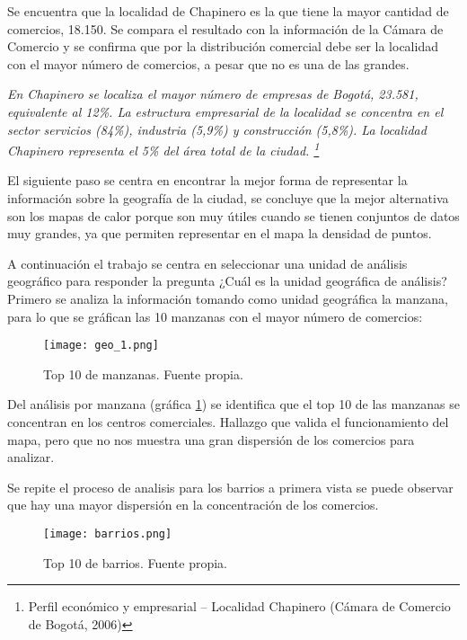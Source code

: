 \documentclass[a4paper]{article}
\begin{document}
Se encuentra que la localidad de Chapinero es la que tiene la mayor cantidad de comercios, 18.150. Se compara el resultado con la información de la Cámara de Comercio y se confirma que por la distribución comercial debe ser la localidad con el mayor número de comercios, a pesar que no es una de las grandes.

\begin{center}
	\textit{En Chapinero se localiza el mayor número de empresas de Bogotá, 23.581, equivalente al 12\%. La estructura empresarial de la localidad se concentra en el sector servicios (84\%), industria (5,9\%) y construcción (5,8\%). La localidad Chapinero representa el 5\% del área total de la ciudad. \footnote{Perfil económico y empresarial – Localidad Chapinero (Cámara de Comercio de Bogotá, 2006)}}
\end{center}

El siguiente paso se centra en encontrar la mejor forma de representar la información sobre la geografía de la ciudad, se concluye que la mejor alternativa son los mapas de calor porque son muy útiles cuando se tienen conjuntos de datos muy grandes, ya que permiten representar en el mapa la densidad de puntos. 

A continuación el trabajo se centra en seleccionar una unidad de análisis geográfico para responder la pregunta ¿Cuál es la unidad geográfica de análisis? Primero se analiza la información tomando como unidad geográfica la manzana, para lo que se gráfican las 10 manzanas con el mayor número de comercios:

\begin{figure}[h]
    \centering
	\texttt{[image: geo\_1.png]}
    \caption{Top 10 de manzanas. Fuente propia.}
    \label{fig:manzanas}
\end{figure}

Del análisis por manzana (gráfica \ref{fig:manzanas}) se identifica que el top 10 de las manzanas se concentran en los centros comerciales. Hallazgo que valida el funcionamiento del mapa, pero que no nos muestra una gran dispersión de los comercios para analizar.

Se repite el proceso de analisis para los barrios a primera vista se puede observar que hay una mayor dispersión en la concentración de los comercios.

\begin{figure}[h]
    \centering
	\texttt{[image: barrios.png]}
    \caption{Top 10 de barrios. Fuente propia.}
    \label{fig:barrios}
\end{figure}
\end{document}
